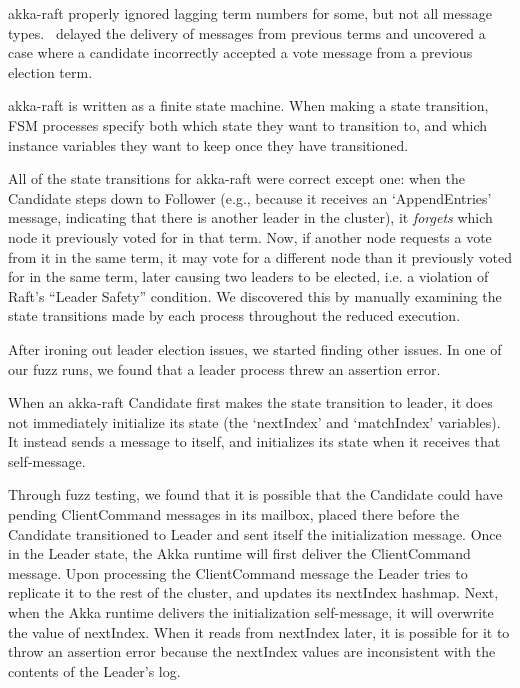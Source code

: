 akka-raft properly ignored lagging term numbers for some, but not all
 message types. \sys~delayed the delivery of messages from previous terms and
 uncovered a case where a candidate incorrectly accepted a vote message from a previous election term.

 akka-raft is written as a finite state machine.
When making a state transition, FSM processes specify both which state they want to transition to, and which instance variables they want to keep once they have transitioned.

All of the state transitions for akka-raft were correct except
one: when the Candidate
steps down to Follower (e.g., because it receives an `AppendEntries' message,
indicating that there is another leader in the cluster), it
{\em forgets} which node it previously voted for in that term. Now, if another
node requests a vote from it in the same term, it may vote for
a different node than it previously voted for in the same term, later causing
two leaders to be elected, i.e. a violation of Raft's ``Leader Safety''
condition. We discovered this by manually examining the state
transitions made by each process throughout the reduced execution.

 After ironing out leader election issues, we started finding other issues.
 In one of our fuzz runs, we found that a leader process threw an assertion error.

When an akka-raft Candidate first makes the state transition to leader, it does not immediately initialize its
 state (the `nextIndex' and `matchIndex' variables). It instead sends a message to itself, and initializes its state when it receives that self-message.

Through fuzz testing, we found that it is possible that the Candidate could have pending
 ClientCommand messages in its mailbox, placed there before the Candidate transitioned to Leader
 and sent itself the initialization message. Once in the Leader state, the Akka runtime will first deliver
 the ClientCommand message. Upon processing the ClientCommand message the Leader tries to replicate it to
 the rest of the cluster, and updates its nextIndex hashmap. Next, when the Akka runtime delivers the
 initialization self-message, it will overwrite the value of nextIndex. When it reads from nextIndex later,
 it is possible for it to throw an assertion error because the nextIndex values are inconsistent with
 the contents of the Leader's log.



